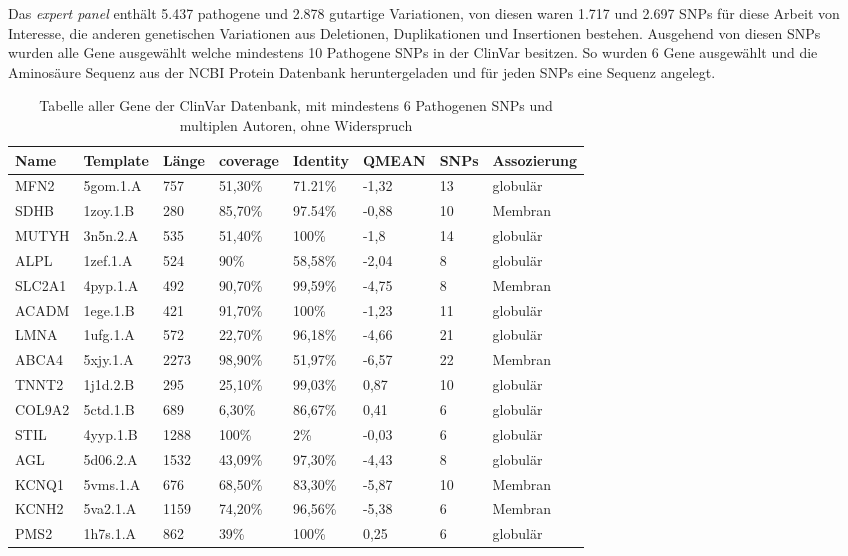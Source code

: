 Das \emph{expert panel} enthält 5.437 pathogene und 2.878 gutartige Variationen, von diesen waren 1.717 und 2.697 \ac{SNPs} für diese Arbeit von Interesse, die anderen genetischen Variationen aus Deletionen, Duplikationen und Insertionen bestehen. Ausgehend von diesen \ac{SNPs} wurden alle Gene ausgewählt welche mindestens 10 Pathogene SNPs in der ClinVar besitzen. So wurden 6 Gene ausgewählt und die Aminosäure Sequenz aus der NCBI Protein Datenbank heruntergeladen und für jeden \ac{SNPs} eine Sequenz angelegt. 

\begin{table}[]
    \centering
    \begin{tabular}{llllllll}
    \hline
    \multicolumn{1}{|l|}{Name} & \multicolumn{1}{l|}{Template} & \multicolumn{1}{l|}{Länge} & \multicolumn{1}{l|}{coverage} & \multicolumn{1}{l|}{Identity} & \multicolumn{1}{l|}{QMEAN} & \multicolumn{1}{l|}{SNPs} & \multicolumn{1}{l|}{Assozierung} \\ \hline
    MFN2 & 5gom.1.A & 757 & 51,30\% & 71.21\% & -1,32 & 13 & globulär \\
    \rowcolor[HTML]{CBFFCB} 
    SDHB & 1zoy.1.B & 280 & 85,70\% & 97.54\% & -0,88 & 10 & Membran \\
    MUTYH & 3n5n.2.A & 535 & 51,40\% & 100\% & -1,8 & 14 & globulär \\
    ALPL & 1zef.1.A & 524 & 90\% & 58,58\% & -2,04 & 8 & globulär \\
    \rowcolor[HTML]{9AFF99} 
    SLC2A1 & 4pyp.1.A & 492 & 90,70\% & 99,59\% & -4,75 & 8 & Membran \\
    \rowcolor[HTML]{9AFF99} 
    ACADM & 1ege.1.B & 421 & 91,70\% & 100\% & -1,23 & 11 & globulär \\
    LMNA & 1ufg.1.A & 572 & 22,70\% & 96,18\% & -4,66 & 21 & globulär \\
    ABCA4 & 5xjy.1.A & 2273 & 98,90\% & 51,97\% & -6,57 & 22 & Membran \\
    TNNT2 & 1j1d.2.B & 295 & 25,10\% & 99,03\% & 0,87 & 10 & globulär \\
    COL9A2 & 5ctd.1.B & 689 & 6,30\% & 86,67\% & 0,41 & 6 & globulär \\
    STIL & 4yyp.1.B & 1288 & 100\% & 2\% & -0,03 & 6 & globulär \\
    AGL & 5d06.2.A & 1532 & 43,09\% & 97,30\% & -4,43 & 8 & globulär \\
    \rowcolor[HTML]{CBFFCB} 
    KCNQ1 & 5vms.1.A & 676 & 68,50\% & 83,30\% & -5,87 & 10 & Membran \\
    \rowcolor[HTML]{CBFFCB} 
    KCNH2 & 5va2.1.A & 1159 & 74,20\% & 96,56\% & -5,38 & 6 & Membran \\
    PMS2 & 1h7s.1.A & 862 & 39\% & 100\% & 0,25 & 6 & globulär
    \end{tabular}
    \caption{Tabelle aller Gene der ClinVar Datenbank, mit mindestens 6 Pathogenen SNPs und multiplen Autoren, ohne Widerspruch}
    \label{tab:multiple_subs_snps}
\end{table}

